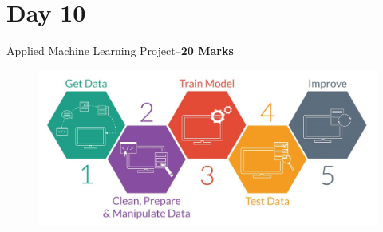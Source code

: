 \documentclass[11pt]{article}
\begin{document}
\section{Day 10}
Applied Machine Learning Project--\hspace{9cm}\textbf{20 Marks}\\
\vspace{5cm}
\begin{figure}[h!]
\centering
\includegraphics[scale=.3]{img/mlproj.jpeg}
\end{figure}
\pagebreak
\end{document}
